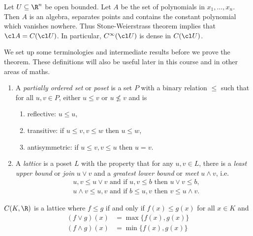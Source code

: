 \documentclass[a4paper]{article}
\begin{document}
\begin{eg}
  Let \(U \subseteq \R^n\) be open bounded. Let \(A\) be the set of polynomials in \(x_1, \dots, x_n\). Then \(A\) is an algebra, separates points and contains the constant polynomial which vanishes nowhere. Thus Stone-Weierstrass theorem implies that \(\cl A = C(\cl U)\). In particular, \(C^\infty(\cl U)\) is dense in \(C(\cl U)\).
\end{eg}

We set up some terminologies and intermediate results before we prove the theorem. These definitions will also be useful later in this course and in other areas of maths. %

\begin{definition}\leavevmode
  \begin{enumerate}
  \item A \emph{partially ordered set} or \emph{poset} is a set \(P\) with a binary relation \(\leq\) such that for all \(u, v \in P\), either \(u \leq v\) or \(u \nleq v\) and is
    \begin{enumerate}
    \item reflective: \(u \leq u\),
    \item transitive: if \(u \leq v, v \leq w\) then \(u \leq w\),
    \item antisymmetric: if \(u \leq v, v \leq u\) then \(u = v\).
    \end{enumerate}
  \item A \emph{lattice} is a poset \(L\) with the property that for any \(u, v \in L\), there is a \emph{least upper bound} or \emph{join} \(u \vee v\) and a \emph{greatest lower bound} or \emph{meet} \(u \wedge v\), i.e.\
    \begin{align*}
      & u, v \leq u \vee v \text{ and if } u, v \leq b \text{ then } u \vee v \leq b, \\
      & u \wedge v \leq u, v \text{ and if } b \leq u, v \text{ then } v \leq u \wedge v.
    \end{align*}
  \end{enumerate}
\end{definition}

\begin{eg}
  \(C(K, \R)\) is a lattice where \(f \leq g\) if and only if \(f(x) \leq g(x)\) for all \(x \in K\) and
  \begin{align*}
    (f \vee g) (x) &= \max \{f(x), g(x)\} \\
    (f \wedge g) (x) &= \min \{f(x), g(x)\}
  \end{align*}
\end{eg}
\end{document}
